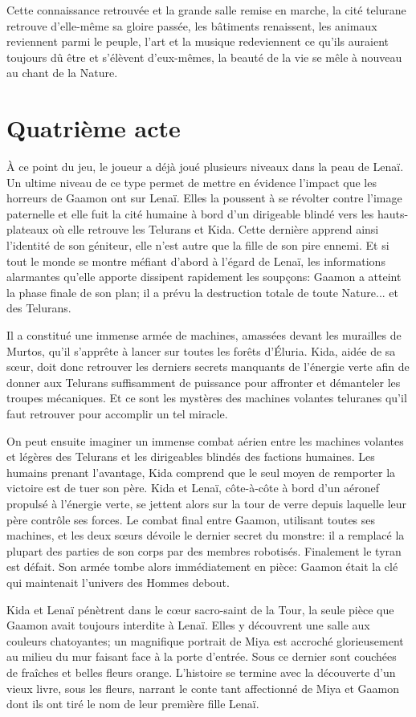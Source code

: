 Cette connaissance retrouvée et la grande salle remise en marche, la cité telurane retrouve d'elle-même sa gloire passée, les bâtiments renaissent, les animaux reviennent parmi le peuple, l'art et la musique redeviennent ce qu'ils auraient toujours dû être et s'élèvent d'eux-mêmes, la beauté de la vie se mêle à nouveau au chant de la Nature.

\section{Quatrième acte}
\label{sec:quatriemeActe}
À ce point du jeu, le joueur a déjà joué plusieurs niveaux dans la peau de Lenaï. Un ultime niveau de ce type permet de mettre en évidence l'impact que les horreurs de Gaamon ont sur Lenaï. Elles la poussent à se révolter contre l'image paternelle et elle fuit la cité humaine à bord d'un dirigeable blindé vers les hauts-plateaux où elle retrouve les Telurans et Kida. Cette dernière apprend ainsi l'identité de son géniteur, elle n'est autre que la fille de son pire ennemi. Et si tout le monde se montre méfiant d'abord à l'égard de Lenaï, les informations alarmantes qu'elle apporte dissipent rapidement les soupçons: Gaamon a atteint la phase finale de son plan; il a prévu la destruction totale de toute Nature... et des Telurans. 

Il a constitué une immense armée de machines, amassées devant les murailles de Murtos, qu'il s'apprête à lancer sur toutes les forêts d'Éluria. Kida, aidée de sa s\oe ur, doit donc retrouver les derniers secrets manquants de l'énergie verte afin de donner aux Telurans suffisamment de puissance pour affronter et démanteler les troupes mécaniques. Et ce sont les mystères des machines volantes teluranes qu'il faut retrouver pour accomplir un tel miracle.

On peut ensuite imaginer un immense combat aérien entre les machines volantes et légères des Telurans et les dirigeables blindés des factions humaines. Les humains prenant l'avantage, Kida comprend que le seul moyen de remporter la victoire est de tuer son père. Kida et Lenaï, côte-à-côte à bord d'un aéronef propulsé à l'énergie verte, se jettent alors sur la tour de verre depuis laquelle leur père contrôle ses forces. Le combat final entre Gaamon, utilisant toutes ses machines, et les deux s\oe urs dévoile le dernier secret du monstre: il a remplacé la plupart des parties de son corps par des membres robotisés. Finalement le tyran est défait. Son armée tombe alors immédiatement en pièce: Gaamon était la clé qui maintenait l'univers des Hommes debout.

Kida et Lenaï pénètrent dans le c\oe ur sacro-saint de la Tour, la seule pièce que Gaamon avait toujours interdite à Lenaï. Elles y découvrent une salle aux couleurs chatoyantes; un magnifique portrait de Miya est accroché glorieusement au milieu du mur faisant face à la porte d'entrée. Sous ce dernier sont couchées de fraîches et belles fleurs orange. L'histoire se termine avec la découverte d'un vieux livre, sous les fleurs, narrant le conte tant affectionné de Miya et Gaamon dont ils ont tiré le nom de leur première fille Lenaï.


